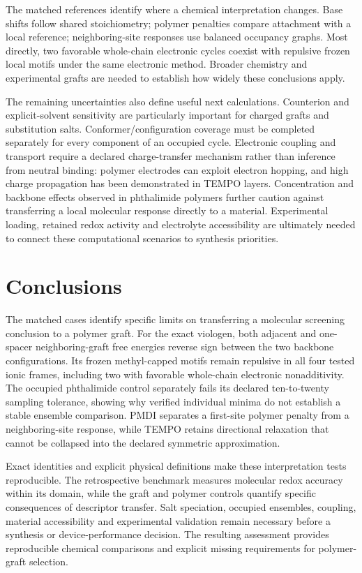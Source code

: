 \documentclass[11pt]{article}
\begin{document}
The matched references identify where a chemical interpretation changes. Base shifts follow shared stoichiometry; polymer penalties compare attachment with a local reference; neighboring-site responses use balanced occupancy graphs. Most directly, two favorable whole-chain electronic cycles coexist with repulsive frozen local motifs under the same electronic method. Broader chemistry and experimental grafts are needed to establish how widely these conclusions apply.

The remaining uncertainties also define useful next calculations. Counterion and explicit-solvent sensitivity are particularly important for charged grafts and substitution salts. Conformer/configuration coverage must be completed separately for every component of an occupied cycle. Electronic coupling and transport require a declared charge-transfer mechanism rather than inference from neutral binding: polymer electrodes can exploit electron hopping, and high charge propagation has been demonstrated in TEMPO layers.\cite{hopping2013,oyaizu2008} Concentration and backbone effects observed in phthalimide polymers further caution against transferring a local molecular response directly to a material.\cite{mohanty2026backbone} Experimental loading, retained redox activity and electrolyte accessibility are ultimately needed to connect these computational scenarios to synthesis priorities.

\section{Conclusions}
The matched cases identify specific limits on transferring a molecular screening conclusion to a polymer graft. For the exact viologen, both adjacent and one-spacer neighboring-graft free energies reverse sign between the two backbone configurations. Its frozen methyl-capped motifs remain repulsive in all four tested ionic frames, including two with favorable whole-chain electronic nonadditivity. The occupied phthalimide control separately fails its declared ten-to-twenty sampling tolerance, showing why verified individual minima do not establish a stable ensemble comparison. PMDI separates a first-site polymer penalty from a neighboring-site response, while TEMPO retains directional relaxation that cannot be collapsed into the declared symmetric approximation.

Exact identities and explicit physical definitions make these interpretation tests reproducible. The retrospective benchmark measures molecular redox accuracy within its domain, while the graft and polymer controls quantify specific consequences of descriptor transfer. Salt speciation, occupied ensembles, coupling, material accessibility and experimental validation remain necessary before a synthesis or device-performance decision. The resulting assessment provides reproducible chemical comparisons and explicit missing requirements for polymer-graft selection.
\end{document}
